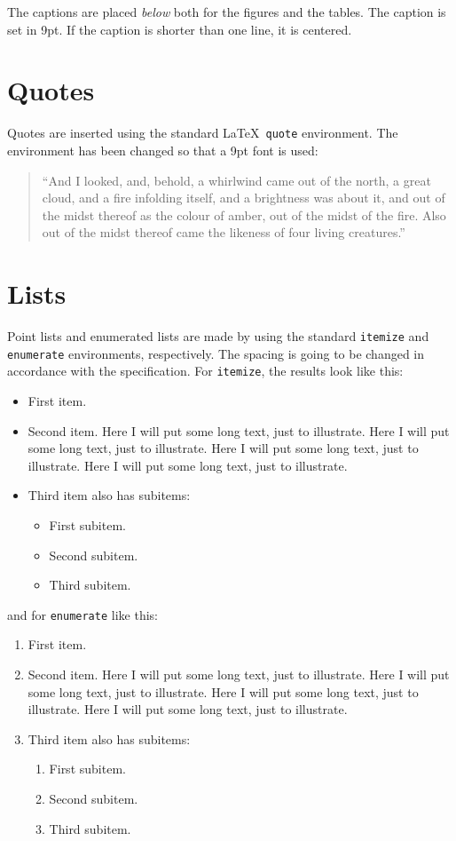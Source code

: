 The captions are placed \emph{below} both for the figures and the
tables. The caption is set in 9pt. If the caption is shorter than one
line, it is centered.

\section{Quotes}
\label{sec:Quotes} %

Quotes are inserted using the standard \LaTeX\ \texttt{quote}
environment. The environment has been changed so that a 9pt font is
used:

\begin{quote}
  ``And I looked, and, behold, a whirlwind came out of the north, a
  great cloud, and a fire infolding itself, and a brightness was about
  it, and out of the midst thereof as the colour of amber, out of the
  midst of the fire. Also out of the midst thereof came the likeness
  of four living creatures.''
\end{quote}

\section{Lists}
\label{sec:lists}

Point lists and enumerated lists are made by using the standard
\texttt{itemize} and \texttt{enumerate} environments, respectively.
The spacing is going to be changed in accordance with the specification. For
\texttt{itemize}, the results look like this:
\begin{itemize}
	\item First item.
	\item Second item. Here I will put some long text, just to illustrate.
	  Here I will put some long text, just to illustrate. Here I will put
	  some long text, just to illustrate. Here I will put some long text,
	  just to illustrate.
	\item Third item also has subitems:
	  \begin{itemize}
		  \item First subitem.
		  \item Second subitem.
		  \item Third subitem.
	  \end{itemize}
\end{itemize}
and for \texttt{enumerate} like this:
\begin{enumerate}
	\item First item.
	\item Second item. Here I will put some long text, just to illustrate.
	  Here I will put some long text, just to illustrate. Here I will put
	  some long text, just to illustrate. Here I will put some long text,
	  just to illustrate.
	\item Third item also has subitems:
	  \begin{enumerate}
		  \item First subitem.
		  \item Second subitem.
		  \item Third subitem.
	  \end{enumerate}
\end{enumerate}

